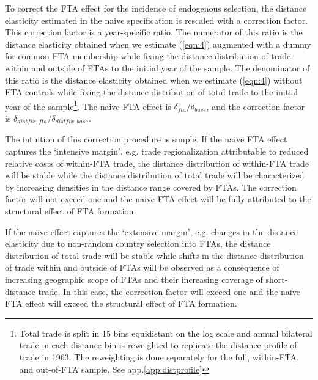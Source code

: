 \documentclass[12pt,twoside,a4paper,notitlepage]{article}
\begin{document}
To correct the FTA effect for the incidence of endogenous selection, the distance elasticity estimated in the naive  specification is rescaled with a correction factor. This correction factor is a year-specific ratio. The numerator of this ratio is the distance elasticity obtained when we estimate (\ref{eqn:4}) augmented with a dummy for common FTA membership while fixing the distance distribution of trade within and outside of FTAs to the initial year of the sample. The denominator of this ratio is the distance elasticity obtained when we estimate (\ref{eqn:4}) without FTA controls while fixing the distance distribution of total trade to the initial year of the sample\footnote{Total trade is split in 15 bins equidistant on the log scale and annual bilateral trade in each distance bin is reweighted to replicate the distance profile of trade in 1963. The reweighting is done separately for the full, within-FTA, and out-of-FTA sample. See app.\ref{app:distprofile}}. The naive FTA effect is $\delta_{fta}/\delta_{base}$, and the correction factor is $\delta_{distfix,fta}/\delta_{distfix,base}$. 

The intuition of this correction procedure is simple. If the naive FTA effect captures the `intensive margin', e.g. trade regionalization attributable to reduced relative costs of within-FTA trade, the distance distribution of within-FTA trade will be stable while the distance distribution of total trade will be characterized by increasing densities in the distance range covered by FTAs. The correction factor will not exceed one and the naive FTA effect will be fully attributed to the structural effect of FTA formation.

If the naive effect captures the `extensive margin', e.g. changes in the distance elasticity due to non-random country selection into FTAs, the distance distribution of total trade will be stable while shifts in the distance distribution of trade within and outside of FTAs will be observed as a consequence of increasing geographic scope of FTAs and their increasing coverage of short-distance trade. In this case, the correction factor will exceed one and the naive FTA effect will exceed the structural effect of FTA formation. 
\end{document}
